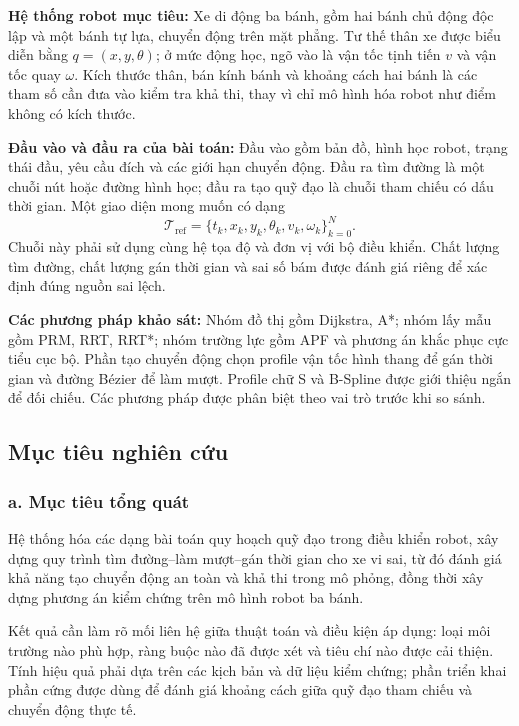 \documentclass[12pt,a4paper,oneside]{report}
\begin{document}
\textbf{Hệ thống robot mục tiêu:} Xe di động ba bánh, gồm hai bánh chủ động độc lập và một bánh tự lựa, chuyển động trên mặt phẳng. Tư thế thân xe được biểu diễn bằng \(q=(x,y,\theta)\); ở mức động học, ngõ vào là vận tốc tịnh tiến \(v\) và vận tốc quay \(\omega\). Kích thước thân, bán kính bánh và khoảng cách hai bánh là các tham số cần đưa vào kiểm tra khả thi, thay vì chỉ mô hình hóa robot như điểm không có kích thước.

\textbf{Đầu vào và đầu ra của bài toán:} Đầu vào gồm bản đồ, hình học robot, trạng thái đầu, yêu cầu đích và các giới hạn chuyển động. Đầu ra tìm đường là một chuỗi nút hoặc đường hình học; đầu ra tạo quỹ đạo là chuỗi tham chiếu có dấu thời gian. Một giao diện mong muốn có dạng
\[
  \mathcal{T}_{\mathrm{ref}}=
    \{t_k,x_k,y_k,\theta_k,v_k,\omega_k\}_{k=0}^{N}.
\]
Chuỗi này phải sử dụng cùng hệ tọa độ và đơn vị với bộ điều khiển. Chất lượng tìm đường, chất lượng gán thời gian và sai số bám được đánh giá riêng để xác định đúng nguồn sai lệch.

\textbf{Các phương pháp khảo sát:} Nhóm đồ thị gồm Dijkstra, A*; nhóm lấy mẫu gồm PRM, RRT, RRT*; nhóm trường lực gồm APF và phương án khắc phục cực tiểu cục bộ. Phần tạo chuyển động chọn profile vận tốc hình thang để gán thời gian và đường Bézier để làm mượt. Profile chữ S và B-Spline được giới thiệu ngắn để đối chiếu. Các phương pháp được phân biệt theo vai trò trước khi so sánh.

\subsection{Mục tiêu nghiên cứu}

\subsubsection*{a. Mục tiêu tổng quát}

Hệ thống hóa các dạng bài toán quy hoạch quỹ đạo trong điều khiển robot, xây dựng quy trình tìm đường--làm mượt--gán thời gian cho xe vi sai, từ đó đánh giá khả năng tạo chuyển động an toàn và khả thi trong mô phỏng, đồng thời xây dựng phương án kiểm chứng trên mô hình robot ba bánh.

Kết quả cần làm rõ mối liên hệ giữa thuật toán và điều kiện áp dụng: loại môi trường nào phù hợp, ràng buộc nào đã được xét và tiêu chí nào được cải thiện. Tính hiệu quả phải dựa trên các kịch bản và dữ liệu kiểm chứng; phần triển khai phần cứng được dùng để đánh giá khoảng cách giữa quỹ đạo tham chiếu và chuyển động thực tế.
\end{document}

